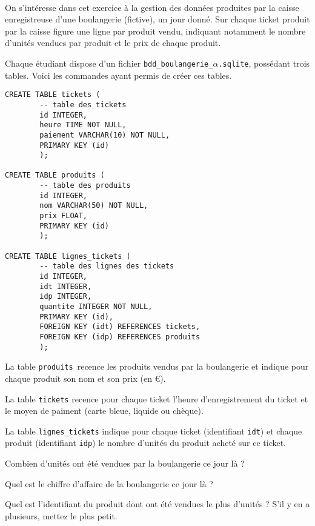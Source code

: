 \exer{[SQL-003]}
\setcounter{numques}{0}~\\

On s'intéresse dans cet exercice à la gestion des données produites par la caisse enregistreuse d'une boulangerie (fictive), un jour donné. Sur chaque ticket produit par la caisse figure une ligne par produit vendu, indiquant notamment le nombre d'unités vendues par produit et le prix de chaque produit. 

Chaque étudiant dispose d'un fichier \texttt{bdd\_boulangerie\_}$\alpha$\texttt{.sqlite}, possédant trois tables. Voici les commandes ayant permis de créer ces tables. 
\begin{lstlisting}
CREATE TABLE tickets (
        -- table des tickets
        id INTEGER,
        heure TIME NOT NULL,
        paiement VARCHAR(10) NOT NULL,
        PRIMARY KEY (id)
        );

CREATE TABLE produits (
        -- table des produits
        id INTEGER,
        nom VARCHAR(50) NOT NULL,
        prix FLOAT,
        PRIMARY KEY (id)
        );

CREATE TABLE lignes_tickets (
        -- table des lignes des tickets
        id INTEGER,
        idt INTEGER,
        idp INTEGER,
        quantite INTEGER NOT NULL,
        PRIMARY KEY (id),
        FOREIGN KEY (idt) REFERENCES tickets,
        FOREIGN KEY (idp) REFERENCES produits
        );
\end{lstlisting}

La table \texttt{produits} recence les produits vendus par la boulangerie et indique pour chaque produit son nom et son prix (en €). 

La table \texttt{tickets} recence pour chaque ticket l'heure d'enregistrement du ticket et le moyen de paiment (carte bleue, liquide ou chèque).

La table \texttt{lignes\_tickets} indique pour chaque ticket (identifiant \texttt{idt}) et chaque produit (identifiant \texttt{idp}) le nombre d'unités du produit acheté sur ce ticket. 

\bigskip{}

\question{} Combien d'unités ont été vendues par la boulangerie ce jour là ?

\bigskip{}

\question{} Quel est le chiffre d'affaire de la boulangerie ce jour là ? 

\medskip{}

\question{} Quel est l'identifiant du produit dont ont été vendues le plus d'unités ? S'il y en a plusieurs, mettez le plus petit. 

